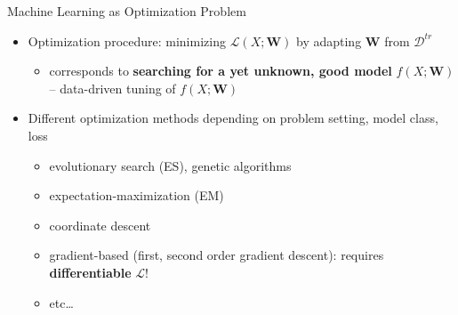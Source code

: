 \begin{frame}{Machine Learning as Optimization Problem}
\protect\hypertarget{machine-learning-as-optimization-problem}{}
\begin{itemize}
\item
  Optimization procedure: minimizing \(\mathcal{L}(X;\mathbf{W})\) by
  adapting \(\mathbf{W}\) from \(\mathcal{D}^{tr}\)

  \begin{itemize}
  \tightlist
  \item
    corresponds to \textbf{searching for a yet unknown, good model}
    \(f(X;\mathbf{W})\) -- data-driven tuning of \(f(X;\mathbf{W})\)
  \end{itemize}
\item
  Different optimization methods depending on problem setting, model
  class, loss

  \begin{itemize}
  \tightlist
  \item
    evolutionary search (ES), genetic algorithms
  \item
    expectation-maximization (EM)
  \item
    coordinate descent
  \item
    gradient-based (first, second order gradient descent): requires
    \textbf{differentiable} \(\mathcal{L}\)!
  \item
    etc\ldots{}
  \end{itemize}
\end{itemize}

\end{frame}

